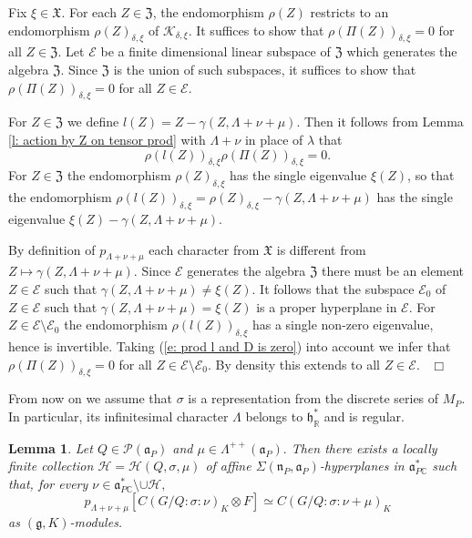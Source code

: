 \documentclass[12pt,a4paper]{article}
\newtheorem{Lemma}[Thm]{Lemma}
\newenvironment{lemma}[0]{\begin{Lemma}\noindent}%
{\end{Lemma}}
\def\qed{~\hfill\hbox{$\Box$}\medbreak}
\def\msy#1{{\mathbb #1}}
\def\C{{\msy C}}
\def\R{{\msy R}}
\def\gd{\delta}
\def\gg{\gamma}
\def\gl{\lambda}
\def\gs{\sigma}
\def\gS{\Sigma}
\def\got#1{\mathfrak #1}
\def\fa{{\got a}}
\def\fg{{\got g}}
\def\fh{{\got h}}
\def\fn{{\got n}}
\def\iC{{\scriptscriptstyle \C}}
\def\cE{{\mathcal E}}
\def\cH{{\mathcal H}}
\def\cK{{\mathcal K}}
\def\cP{{\mathcal P}}
\numberwithin{Thm}{section}
\numberwithin{equation}{section}
\def\fZ{{\mathfrak Z}}
\def\faPdc{{\fa_{P\iC}^*}}
\def\gL{\Lambda}
\numberwithin{equation}{section}
\def\fZ{{\mathfrak Z}}
\def\gL{\Lambda}
\def\faPdc{\fa_{P\iC}^*}
\def\fh{{\mathfrak h}}
\def\fX{{\mathfrak X}}
\def\cchidiff{\xi}
\def\bfhyp{hyperplanes}
\begin{document}
Fix $\cchidiff \in \fX.$ For each $Z \in \fZ$, the endomorphism $\rho(Z)$ restricts to an endomorphism 
$\rho(Z)_{\gd,\cchidiff}$ of $\cK_{\gd, \cchidiff}.$ It suffices to show that $\rho(\Pi(Z))_{\gd,\cchidiff} = 0$ 
for all $Z \in \fZ.$ Let $\cE$ be a finite dimensional linear subspace of $\fZ$ 
which generates the algebra $\fZ.$ Since $\fZ$ is the union of such subspaces, it suffices to 
show that $\rho(\Pi(Z))_{\gd,\cchidiff} = 0$ for all $Z \in \cE.$ 

For $Z \in \fZ$ we define $l(Z) = Z - \gg(Z, \gL +\nu + \mu).$ Then it follows from 
Lemma \ref{l: action by Z on tensor prod} with $\gL + \nu$ in place of $\gl$  that 
\begin{equation}
\label{e: prod l and D is zero}
\rho(l(Z))_{\gd,\cchidiff} \rho(\Pi(Z))_{\gd, \cchidiff} = 0.
\end{equation}
For $Z \in \fZ$ the endomorphism $\rho(Z)_{\gd, \cchidiff}$ has the single eigenvalue
$\cchidiff(Z)$, so that the endomorphism $\rho(l(Z))_{\gd,\cchidiff} = \rho(Z)_{\gd,\cchidiff} - \gg(Z, \gL + \nu +\mu)$ 
has the single eigenvalue $\cchidiff(Z) - \gg(Z, \gL + \nu + \mu).$ 

By definition of $p_{\gL + \nu + \mu}$ each character from $\fX$ is different from 
$Z \mapsto \gg(Z, \gL + \nu + \mu).$ Since $\cE$ generates the algebra 
$\fZ$ there must be an element $Z \in \cE$ such that $\gg(Z, \gL + \nu + \mu) \neq \cchidiff(Z).$ 
It follows that the subspace $\cE_0$ of $Z \in \cE$ such that $\gg(Z, \gL + \nu + \mu) =  \cchidiff(Z)$ 
is a proper hyperplane in $\cE.$ For $Z \in \cE\setminus \cE_0$ the endomorphism
$\rho(l(Z))_{\gd, \cchidiff}$ has a single non-zero eigenvalue, hence is invertible.
Taking (\ref{e: prod l and D is zero}) into account we infer that $\rho(\Pi(Z))_{\gd,\cchidiff} = 0$ 
for all $Z \in \cE \setminus \cE_0.$ By density this extends to all $Z \in \cE$. 
\qed

From now on we assume that $\gs$ is a representation from 
the discrete series of $M_P.$ In particular, its infinitesimal character $\gL$ belongs
to $\fh_\R^*$ and is regular. 
\begin{lemma}
\label{l: iso image pr}
Let $Q \in \cP(\fa_P)$ and $\mu \in \gL^{++}(\fa_P).$ 
Then there exists a locally finite collection $\cH = \cH(Q, \gs, \mu)$ of  
affine $\gS(\fn_P, \fa_P)$-{\bfhyp} in $\faPdc$ such that, 
for every $\nu \in \faPdc\setminus \cup \cH,$ 
$$ 
p_{\gL + \nu + \mu} [C(G/Q: \gs: \nu)_K \otimes F] \simeq C(G/Q:\gs: \nu + \mu)_K
$$ 
as $(\fg, K)$-modules.  
\end{lemma}
\end{document}
